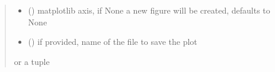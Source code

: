 \documentclass[letterpaper,10pt,english]{sphinxmanual}
\begin{document}
\begin{fulllineitems}
\begin{fulllineitems}
\begin{quote}
\begin{description}
\begin{itemize}
\item {} 
\sphinxAtStartPar
{} (\sphinxstyleliteralemphasis{\sphinxupquote{, }}) \textendash{} matplotlib axis, if None a new figure will be created, defaults to None

\item {} 
\sphinxAtStartPar
{} () \textendash{} if provided, name of the file to save the plot

\end{itemize}

\sphinxAtStartPar
{} or a tuple 

\end{description}\end{quote}

\end{fulllineitems}


\end{fulllineitems}

\end{document}
